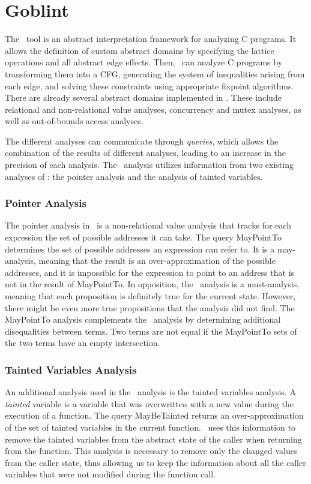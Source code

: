 \section{Goblint}

The \goblint\ tool is an abstract interpretation framework for analyzing C programs.
It allows the definition of custom abstract domains by specifying the lattice operations and all abstract edge effects.
Then, \goblint\ can analyze C programs by transforming them into a CFG, generating the system of inequalities arising from each edge, and solving these constraints using appropriate fixpoint algorithms.
There are already several abstract domains implemented in \goblint. These include relational and non-relational value analyses, concurrency and mutex analyses, as well as out-of-bounds access analyses.

The different analyses can communicate through \emph{queries}, which allows the combination of the results of different analyses, leading to an increase in the precision of each analysis.
The \cpo\ analysis utilizes information from two existing analyses of \goblint: the pointer analysis and the analysis of tainted variables.

\subsubsection{Pointer Analysis}

The pointer analysis in \goblint\ is a non-relational value analysis that tracks for each expression the set of possible addresses it can take.
The query \textsf{MayPointTo} determines the set of possible addresses an expression can refer to.
It is a may-analysis, meaning that the result is an over-approximation of the possible addresses, and it is impossible for the expression to point to an address that is not in the result of \textsf{MayPointTo}.
In opposition, the \cpo\ analysis is a must-analysis, meaning that each proposition is definitely true for the current state. However, there might be even more true propositions that the analysis did not find.
The \textsf{MayPointTo} analysis complements the \cpo\ analysis by determining additional disequalities between terms.
Two terms are not equal if the \textsf{MayPointTo} sets of the two terms have an empty intersection.

\subsubsection{Tainted Variables Analysis}

An additional analysis used in the \cpo\ analysis is the tainted variables analysis.
A \emph{tainted} variable is a variable that was overwritten with a new value during the execution of a function.
The query \textsf{MayBeTainted} returns an over-approximation of the set of tainted variables in the current function.
\cpo\ uses this information to remove the tainted variables from the abstract state of the caller when returning from the function.
This analysis is necessary to remove only the changed values from the caller state, thus allowing us to keep the information about all the caller variables that were not modified during the function call.
